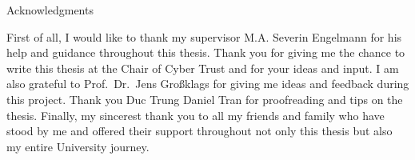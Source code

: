 \thispagestyle{empty}

\vspace*{20mm}

\begin{center}
	{ Acknowledgments}
\end{center}

\vspace{10mm}

First of all, I would like to thank my supervisor M.A. Severin Engelmann for his help
and guidance throughout this thesis. Thank you for giving me the chance to write
this thesis at the Chair of Cyber Trust and for your ideas and input. I am also
grateful to Prof.\ Dr.\ Jens Großklags for giving me ideas and feedback during this
project. Thank you Duc Trung Daniel Tran for proofreading and tips on the thesis.
Finally, my sincerest thank you to all my friends and family who have stood by me
and offered their support throughout not only this thesis but also my entire
University journey.

\cleardoublepage{}
